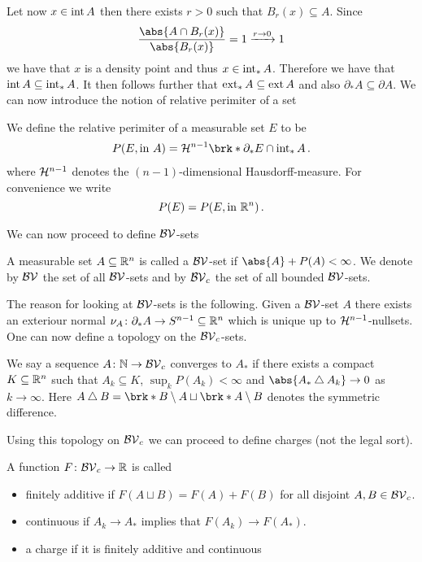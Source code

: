 \noindent Let now $x\in\operatorname{int} A$ then there exists $r>0$ such that $B_r(x)\subseteq A$. Since
\begin{align*}
	\frac{\abs{A\cap B_r(x)}}{\abs{B_r(x)}}=1\xrightarrow{r\to0}1
\end{align*}
we have that $x$ is a density point and thus $x\in\operatorname{int}_*A$. Therefore we have that $\operatorname{int} A\subseteq \operatorname{int}_*A$. It then follows further that $\operatorname{ext}_*A\subseteq\operatorname{ext} A$ and also $\partial_*A\subseteq\partial A$. We can now introduce the notion of relative perimiter of a set 

\begin{definition}
We define the relative perimiter of a measurable set $E$ to be 
\begin{align*}
	P(E,\text{in }A)=\cH^{n-1}\brk*{\partial_*E\cap \interiour_*A}\,.
\end{align*}
where $\mathcal{H}^{n-1}$ denotes the $(n-1)$-dimensional Hausdorff-measure. For convenience we write $$P(E)=P(E,\text{in }\mathbb{R}^n)\,.$$
\end{definition}

\noindent We can now proceed to define $\BV$-sets

\begin{definition}[$\BV$-sets]
A measurable set $A\subseteq\mathbb{R}^n$ is called a $\BV$-set if $ \abs{A}+P(A)<\infty$. We denote by $\BV$ the set of all $\BV$-sets and by $\BV_c$ the set of all bounded $\BV$-sets.
\end{definition}

\noindent The reason for looking at $\BV$-sets is the following. Given a $\BV$-set $A$ there exists an exteriour normal $\nu_A\colon\partial_*A\to S^{n-1}\subseteq \mathbb{R}^n$ which is unique up to $\mathcal{H}^{n-1}$-nullsets. One can now define a topology on the $\BV_c$-sets.

\begin{definition}[Topology on $\BV_c$]
We say a sequence $A\colon\mathbb{N}\to \mathcal{BV}_c$ converges to $A_*$ if there exists a compact $K\subseteq\mathbb{R}^n$ such that $A_k\subseteq K$, $\sup_kP(A_k)<\infty$ and $\abs{A_*\symmDiff A_k}\to0$ as $k\to\infty$. Here $A\symmDiff B=\brk*{B\setminus A}\sqcup \brk*{A\setminus B}$ denotes the symmetric difference.
\end{definition}

\noindent Using this topology on $\BV_c$ we can proceed to define charges (not the legal sort).

\begin{definition}[Charge]
A function $F\colon \mathcal{BV}_c\to\mathbb{R}$ is called
\begin{itemize}
	\item finitely additive if $F(A\sqcup B) =F(A)+F(B)$ for all disjoint $A,B\in\mathcal{BV}_c$.
	\item continuous if $A_k\to A_*$ implies that $F(A_k)\to F(A_*)$.
	\item a charge if it is finitely additive and continuous
\end{itemize}
\end{definition}


